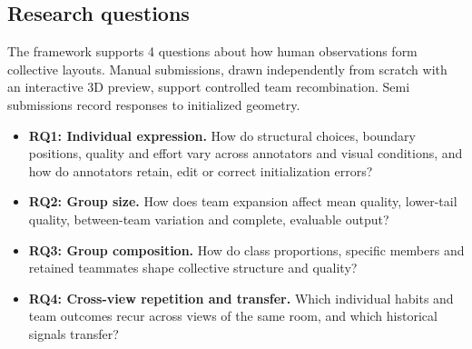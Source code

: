 \subsection{Research questions}
\label{sec:research-questions}
The framework supports 4 questions about how human observations form collective layouts. Manual submissions, drawn independently from scratch with an interactive 3D preview, support controlled team recombination. Semi submissions record responses to initialized geometry.

\begin{itemize}
\item \textbf{RQ1: Individual expression.} How do structural choices, boundary positions, quality and effort vary across annotators and visual conditions, and how do annotators retain, edit or correct initialization errors?
\item \textbf{RQ2: Group size.} How does team expansion affect mean quality, lower-tail quality, between-team variation and complete, evaluable output?
\item \textbf{RQ3: Group composition.} How do class proportions, specific members and retained teammates shape collective structure and quality?
\item \textbf{RQ4: Cross-view repetition and transfer.} Which individual habits and team outcomes recur across views of the same room, and which historical signals transfer?
\end{itemize}
